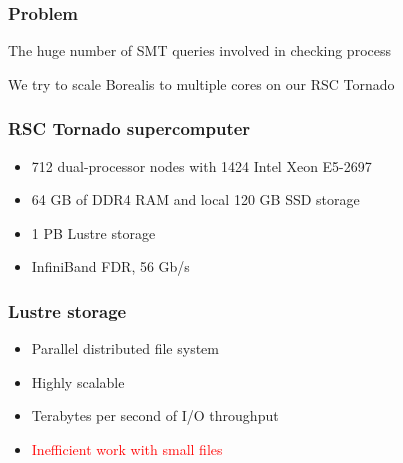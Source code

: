 \begin{frame}
\frametitle{Problem}
	\begin{block}{}
		\centering
		The huge number of SMT queries involved in checking process
	\end{block}
	\begin{block}{}
		\centering
		We try to scale Borealis to multiple cores on our RSC Tornado
	\end{block}
\end{frame}


\begin{frame}
\frametitle{RSC Tornado supercomputer}
\begin{itemize}
\item 712 dual-processor nodes with 1424 Intel Xeon E5-2697
\item 64 GB of DDR4 RAM and local 120 GB SSD storage
\item 1 PB Lustre storage
\item InfiniBand FDR, 56 Gb/s
\end{itemize}
\end{frame}


\begin{frame}
\frametitle{Lustre storage}
\begin{itemize}
\item Parallel distributed file system
\item Highly scalable
\item Terabytes per second of I/O throughput
\item \textcolor{red}{Inefficient work with small files}
\end{itemize}
\end{frame}
